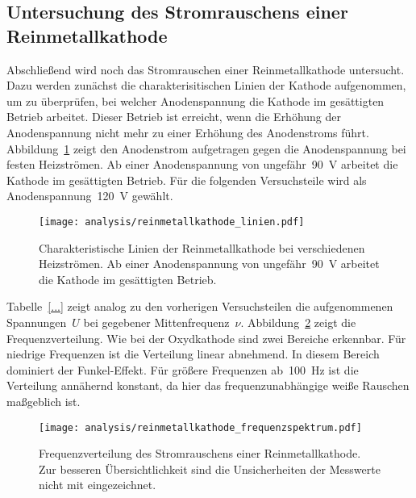 \subsection{Untersuchung des Stromrauschens einer Reinmetallkathode}

Abschließend wird noch das Stromrauschen einer Reinmetallkathode untersucht.
Dazu werden zunächst die charakterisitischen Linien der Kathode aufgenommen, um
zu überprüfen, bei welcher Anodenspannung die Kathode im gesättigten Betrieb
arbeitet. Dieser Betrieb ist erreicht, wenn die Erhöhung der Anodenspannung
nicht mehr zu einer Erhöhung des Anodenstroms führt.
Abbildung~\ref{fig:reinmetallkathode_linien} zeigt den Anodenstrom aufgetragen
gegen die Anodenspannung bei festen Heizströmen. Ab einer Anodenspannung von
ungefähr~\SI{90}{\volt} arbeitet die Kathode im gesättigten Betrieb. Für die
folgenden Versuchsteile wird als Anodenspannung~\SI{120}{\volt} gewählt.

\begin{figure}
  \texttt{[image: analysis/reinmetallkathode\_linien.pdf]}
  \caption{Charakteristische Linien der Reinmetallkathode bei verschiedenen
  Heizströmen. Ab einer Anodenspannung von ungefähr~\SI{90}{\volt} arbeitet die
  Kathode im gesättigten Betrieb.}
  \label{fig:reinmetallkathode_linien}
\end{figure}

Tabelle~\ref{...} zeigt analog zu den vorherigen Versuchsteilen die
aufgenommenen Spannungen~$U$ bei gegebener Mittenfrequenz~$\nu$.
Abbildung~\ref{fig:reinmetallkathode_frequenzspektrum} zeigt die
Frequenzverteilung. Wie bei der Oxydkathode sind zwei Bereiche erkennbar. Für
niedrige Frequenzen ist die Verteilung linear abnehmend. In diesem Bereich
dominiert der Funkel-Effekt. Für größere Frequenzen ab~\SI{100}{\hertz} ist die
Verteilung annähernd konstant, da hier das frequenzunabhängige weiße Rauschen
maßgeblich ist.

\begin{figure}
  \texttt{[image: analysis/reinmetallkathode\_frequenzspektrum.pdf]}
  \caption{Frequenzverteilung des Stromrauschens einer Reinmetallkathode. Zur
  besseren Übersichtlichkeit sind die Unsicherheiten der Messwerte nicht mit
  eingezeichnet.}
  \label{fig:reinmetallkathode_frequenzspektrum}
\end{figure}

